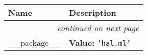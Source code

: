     \vspace{-1cm}
\hspace{\varindent}\begin{longtable}{|p{\varnamewidth}|p{\vardescrwidth}|l}
\cline{1-2}
\cline{1-2} \centering \textbf{Name} & \centering \textbf{Description}& \\
\cline{1-2}
\endhead\cline{1-2}\multicolumn{3}{r}{\small\textit{continued on next page}}\\\endfoot\cline{1-2}
\endlastfoot\raggedright \_\-\_\-p\-a\-c\-k\-a\-g\-e\-\_\-\_\- & \raggedright \textbf{Value:} 
{\tt \texttt{'}\texttt{hal.ml}\texttt{'}}&\\
\cline{1-2}
\end{longtable}

